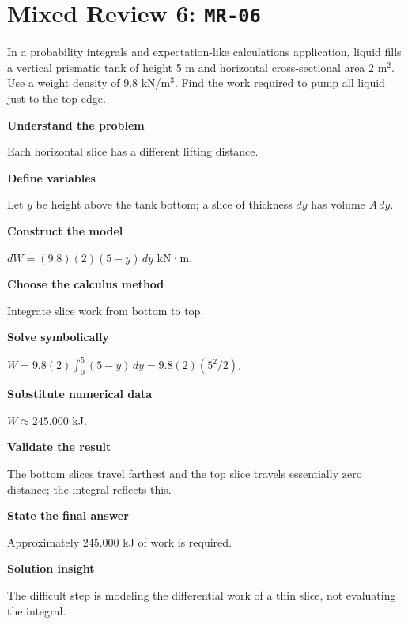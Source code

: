 \documentclass[11pt]{book}
\newcommand{\pid}[1]{\texttt{#1}}
\begin{document}
\section*{Mixed Review 6: \pid{MR-06}}
\begin{problembox}In a probability integrals and expectation-like calculations application, liquid fills a vertical prismatic tank of height 5 m and horizontal cross-sectional area 2 m$^2$. Use a weight density of 9.8 kN/m$^3$. Find the work required to pump all liquid just to the top edge.\end{problembox}
\begin{solutionbox}
\textbf{Understand the problem}\par Each horizontal slice has a different lifting distance.\par\medskip
\textbf{Define variables}\par Let $y$ be height above the tank bottom; a slice of thickness $dy$ has volume $A\,dy$.\par\medskip
\textbf{Construct the model}\par $dW=(9.8)(2)(5-y)\,dy$ kN·m.\par\medskip
\textbf{Choose the calculus method}\par Integrate slice work from bottom to top.\par\medskip
\textbf{Solve symbolically}\par $W=9.8(2)\int_0^{5}(5-y)\,dy=9.8(2)(5^2/2)$.\par\medskip
\textbf{Substitute numerical data}\par $W\approx 245.000$ kJ.\par\medskip
\textbf{Validate the result}\par The bottom slices travel farthest and the top slice travels essentially zero distance; the integral reflects this.\par\medskip
\textbf{State the final answer}\par Approximately $245.000$ kJ of work is required.\par\medskip
\textbf{Solution insight}\par The difficult step is modeling the differential work of a thin slice, not evaluating the integral.\par\medskip
\end{solutionbox}
\end{document}
